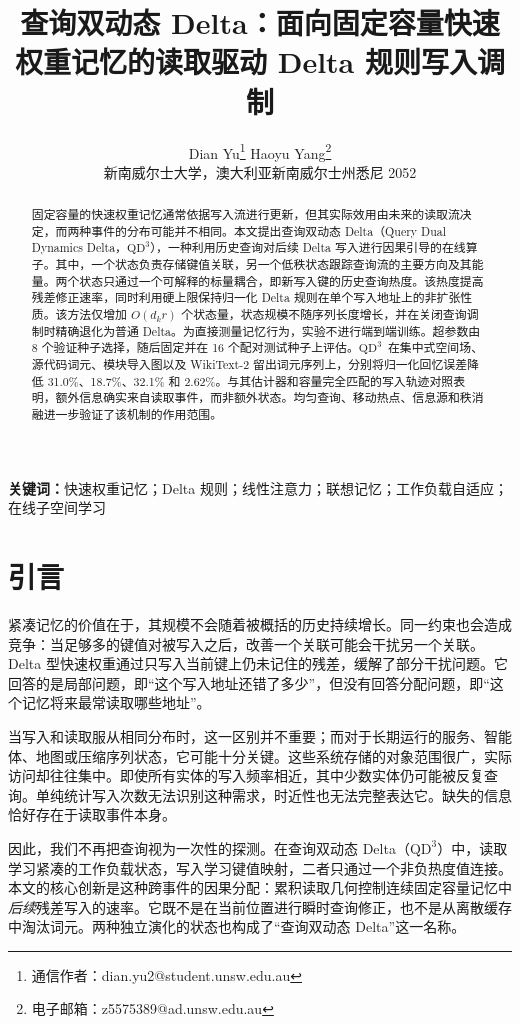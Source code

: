 \documentclass[11pt,a4paper]{ctexart}
\title{查询双动态 Delta：面向固定容量快速权重记忆的读取驱动 Delta 规则写入调制}
\author{Dian Yu\thanks{通信作者：dian.yu2@student.unsw.edu.au}
\quad Haoyu Yang\thanks{电子邮箱：z5575389@ad.unsw.edu.au}\\
\small 新南威尔士大学，澳大利亚新南威尔士州悉尼 2052}
\date{}
\newcommand{\QDDD}{\ensuremath{\mathrm{QD}^{3}}}
\begin{document}
\maketitle

\begin{abstract}
固定容量的快速权重记忆通常依据写入流进行更新，但其实际效用由未来的读取流决定，而两种事件的分布可能并不相同。本文提出查询双动态 Delta（Query Dual Dynamics Delta，\QDDD），一种利用历史查询对后续 Delta 写入进行因果引导的在线算子。其中，一个状态负责存储键值关联，另一个低秩状态跟踪查询流的主要方向及其能量。两个状态只通过一个可解释的标量耦合，即新写入键的历史查询热度。该热度提高残差修正速率，同时利用硬上限保持归一化 Delta 规则在单个写入地址上的非扩张性质。该方法仅增加 $O(d_k r)$ 个状态量，状态规模不随序列长度增长，并在关闭查询调制时精确退化为普通 Delta。为直接测量记忆行为，实验不进行端到端训练。超参数由 8 个验证种子选择，随后固定并在 16 个配对测试种子上评估。\QDDD\ 在集中式空间场、源代码词元、模块导入图以及 WikiText-2 留出词元序列上，分别将归一化回忆误差降低 31.0\%、18.7\%、32.1\% 和 2.62\%。与其估计器和容量完全匹配的写入轨迹对照表明，额外信息确实来自读取事件，而非额外状态。均匀查询、移动热点、信息源和秩消融进一步验证了该机制的作用范围。
\end{abstract}

\noindent\textbf{关键词：}快速权重记忆；Delta 规则；线性注意力；联想记忆；工作负载自适应；在线子空间学习

\section{引言}\label{sec:intro-zh}

紧凑记忆的价值在于，其规模不会随着被概括的历史持续增长。同一约束也会造成竞争：当足够多的键值对被写入之后，改善一个关联可能会干扰另一个关联。Delta 型快速权重通过只写入当前键上仍未记住的残差，缓解了部分干扰问题\cite{widrow1960,schlag2021}。它回答的是局部问题，即“这个写入地址还错了多少”，但没有回答分配问题，即“这个记忆将来最常读取哪些地址”。

当写入和读取服从相同分布时，这一区别并不重要；而对于长期运行的服务、智能体、地图或压缩序列状态，它可能十分关键。这些系统存储的对象范围很广，实际访问却往往集中。即使所有实体的写入频率相近，其中少数实体仍可能被反复查询。单纯统计写入次数无法识别这种需求，时近性也无法完整表达它。缺失的信息恰好存在于读取事件本身。

因此，我们不再把查询视为一次性的探测。在查询双动态 Delta（\QDDD）中，读取学习紧凑的工作负载状态，写入学习键值映射，二者只通过一个非负热度值连接。本文的核心创新是这种跨事件的因果分配：累积读取几何控制连续固定容量记忆中\emph{后续}残差写入的速率。它既不是在当前位置进行瞬时查询修正，也不是从离散缓存中淘汰词元。两种独立演化的状态也构成了“查询双动态 Delta”这一名称。
\end{document}
